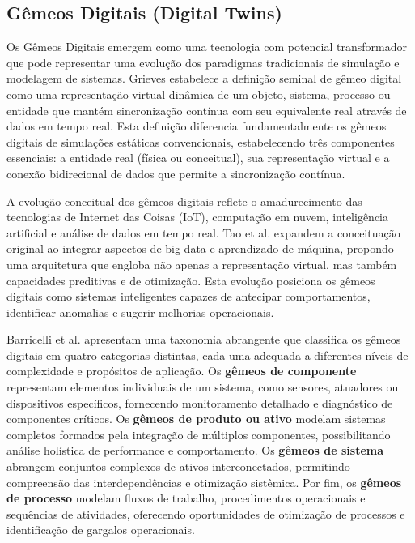 \documentclass[12pt,a4paper]{article}
\begin{document}
\subsection{Gêmeos Digitais (Digital Twins)}

Os Gêmeos Digitais emergem como uma tecnologia com potencial transformador que pode representar uma evolução dos paradigmas tradicionais de simulação e modelagem de sistemas. Grieves \cite{grieves2014} estabelece a definição seminal de gêmeo digital como uma representação virtual dinâmica de um objeto, sistema, processo ou entidade que mantém sincronização contínua com seu equivalente real através de dados em tempo real. Esta definição diferencia fundamentalmente os gêmeos digitais de simulações estáticas convencionais, estabelecendo três componentes essenciais: a entidade real (física ou conceitual), sua representação virtual e a conexão bidirecional de dados que permite a sincronização contínua.

A evolução conceitual dos gêmeos digitais reflete o amadurecimento das tecnologias de Internet das Coisas (IoT), computação em nuvem, inteligência artificial e análise de dados em tempo real. Tao et al. \cite{tao2018} expandem a conceituação original ao integrar aspectos de big data e aprendizado de máquina, propondo uma arquitetura que engloba não apenas a representação virtual, mas também capacidades preditivas e de otimização. Esta evolução posiciona os gêmeos digitais como sistemas inteligentes capazes de antecipar comportamentos, identificar anomalias e sugerir melhorias operacionais.

Barricelli et al. \cite{barricelli2019} apresentam uma taxonomia abrangente que classifica os gêmeos digitais em quatro categorias distintas, cada uma adequada a diferentes níveis de complexidade e propósitos de aplicação. Os \textbf{gêmeos de componente} representam elementos individuais de um sistema, como sensores, atuadores ou dispositivos específicos, fornecendo monitoramento detalhado e diagnóstico de componentes críticos. Os \textbf{gêmeos de produto ou ativo} modelam sistemas completos formados pela integração de múltiplos componentes, possibilitando análise holística de performance e comportamento. Os \textbf{gêmeos de sistema} abrangem conjuntos complexos de ativos interconectados, permitindo compreensão das interdependências e otimização sistêmica. Por fim, os \textbf{gêmeos de processo} modelam fluxos de trabalho, procedimentos operacionais e sequências de atividades, oferecendo oportunidades de otimização de processos e identificação de gargalos operacionais.
\end{document}
